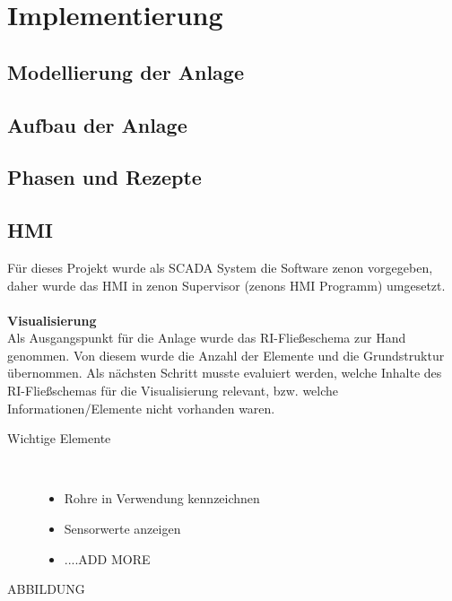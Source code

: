 \chapter{Implementierung} \label{chapter:thevetestcase}
\section{Modellierung der Anlage}
\section{Aufbau der Anlage}
\section{Phasen und Rezepte}
\section{HMI}
Für dieses Projekt wurde als SCADA System die Software zenon vorgegeben, daher wurde das HMI in zenon Supervisor (zenons HMI Programm) umgesetzt.\\
\\
\textbf{Visualisierung}\\
Als Ausgangspunkt für die Anlage wurde das RI-Fließeschema zur Hand genommen. Von diesem wurde die Anzahl der Elemente und die Grundstruktur übernommen. Als nächsten Schritt musste evaluiert werden, welche Inhalte des RI-Fließschemas für die Visualisierung relevant, bzw. welche Informationen/Elemente nicht vorhanden waren.
\begin{description}
\item[Wichtige Elemente]~\par
	\begin{itemize}
		\item Rohre in Verwendung kennzeichnen
		\item Sensorwerte anzeigen
		\item ....ADD MORE
	\end{itemize}
\end{description}
ABBILDUNG\\

